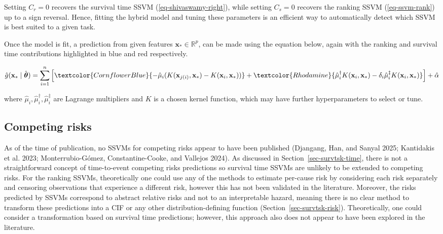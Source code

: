 \documentclass[
  letterpaper,
  krantz2]{style/krantz}
\begin{document}
Setting \(C_r = 0\) recovers the survival time SSVM
(\ref{eq-shivaswamy-right}), while setting \(C_s = 0\) recovers the
ranking SSVM (\ref{eq-ssvm-rank}) up to a sign reversal. Hence, fitting
the hybrid model and tuning these parameters is an efficient way to
automatically detect which SSVM is best suited to a given task.

Once the model is fit, a prediction from given features
\(\mathbf{x}_* \in \mathbb{R}^p\), can be made using the equation below,
again with the ranking and survival time contributions highlighted in
blue and red respectively.

\[
\hat{g}(\mathbf{x}_* \mid \hat{\boldsymbol{\theta}}) = \sum^n_{i=1} \left[\textcolor{CornflowerBlue}{-\hat{\mu}_i(K(\mathbf{x}_{j(i)}, \mathbf{x}_*) - K(\mathbf{x}_i, \mathbf{x}_*))} + \textcolor{Rhodamine}{\hat{\mu}^\dagger_i K(\mathbf{x}_i, \mathbf{x}_*) - \delta_i\hat{\mu}_i^\ddagger K(\mathbf{x}_i, \mathbf{x}_*)}\right] + \hat{\alpha}
\]

where \(\hat{\mu}_i, \hat{\mu}_i^\dagger, \hat{\mu}_i^\ddagger\) are
Lagrange multipliers and \(K\) is a chosen kernel function, which may
have further hyperparameters to select or tune.

\subsection{Competing risks}\label{competing-risks-2}

As of the time of publication, no SSVMs for competing risks appear to
have been published (Djangang, Han, and Sanyal 2025; Kantidakis et al.
2023; Monterrubio-Gómez, Constantine-Cooke, and Vallejos
2024). As
discussed in Section~\ref{sec-survtsk-time}, there is not a
straightforward concept of time-to-event competing risks predictions so
survival time SSVMs are unlikely to be extended to competing risks. For
the ranking SSVMs, theoretically one could use any of the methods to
estimate per-cause risk by considering each risk separately and
censoring observations that experience a different risk, however this
has not been validated in the literature. Moreover, the risks predicted
by SSVMs correspond to abstract relative risks and not to an
interpretable hazard, meaning there is no clear method to transform
these predictions into a CIF or any other distribution-defining function
(Section~\ref{sec-survtsk-risk}). Theoretically, one could consider a
transformation based on survival time predictions; however, this
approach also does not appear to have been explored in the literature.
\end{document}
